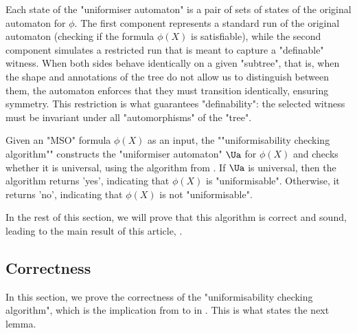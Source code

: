 \documentclass[a4paper,UKenglish,cleveref, autoref, thm-restate]{lipics-v2021}
\begin{document}
Each state of the "uniformiser automaton" is a pair of sets of states of the original automaton for $\phi$.
The first component represents a standard run of the original automaton (checking if the formula $\phi(X)$
is satisfiable), while the second component simulates a restricted run that is meant to capture a "definable" witness.
When both sides behave identically on a given "subtree", that is, when the shape and annotations of the tree do not allow
us to distinguish between them, the automaton enforces that they must transition identically, ensuring symmetry. This restriction
is what guarantees "definability": the selected witness must be invariant under all "automorphisms" of the "tree".

\begin{definition}
	\AP Given an "MSO" formula $\phi(X)$ as an input, the ""uniformisability checking algorithm"" constructs the "uniformiser automaton" $\Ua$ for $\phi(X)$ and checks whether it is universal,
	using the algorithm from .
	If $\Ua$ is universal, then the algorithm returns 'yes', indicating that $\phi(X)$ is "uniformisable".
	Otherwise, it returns 'no', indicating that $\phi(X)$ is not "uniformisable".
\end{definition}

In the rest of this section, we will prove that this algorithm is correct and sound, leading to the main result of this article, .

\subsection{Correctness}\label{section:correctness}

In this section, we prove the correctness of the "uniformisability checking algorithm", which is the
implication from  to   in .
This is what states the next lemma.
\end{document}
